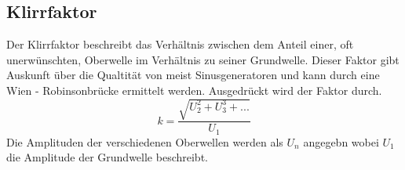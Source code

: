 \subsection{Klirrfaktor}
Der Klirrfaktor beschreibt das Verhältnis zwischen dem Anteil einer, oft unerwünschten, Oberwelle im Verhältnis zu seiner Grundwelle.
Dieser Faktor gibt Auskunft über die Qualtität von meist Sinusgeneratoren und kann durch eine Wien - Robinsonbrücke ermittelt werden.
Ausgedrückt wird der Faktor durch.
\begin{equation}
    \label{eqn:GlasGoesklirr}   
    k = \frac{\sqrt{U_2^2+U_3^3+...}}{U_1}
\end{equation}
Die Amplituden der verschiedenen Oberwellen werden als $U_n$ angegebn wobei $U_1$ die Amplitude der Grundwelle beschreibt.














